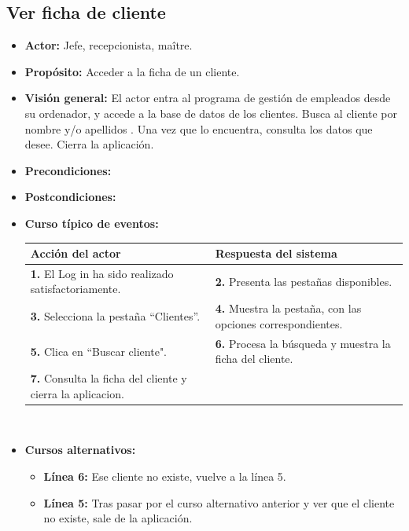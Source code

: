 \documentclass[spanish,a4paper,11pt, twoside]{report}	%
\begin{document}

	\subsection{Ver ficha de cliente}
			\begin{itemize}
			\item \textbf{Actor:} Jefe, recepcionista, maître.
			\item \textbf{Propósito:} Acceder a la ficha de un cliente.
			\item \textbf{Visión general:} El actor entra al programa de gestión de empleados desde su ordenador, y accede a la base de datos de los clientes. Busca al cliente por nombre y/o apellidos . Una vez que lo encuentra, consulta los datos que desee. Cierra la aplicación. 
			\item \textbf{Precondiciones:} 
			\item \textbf{Postcondiciones:} 
			\item \textbf{Curso típico de eventos:} 	\\
				\begin{tabular}{|p{6cm}||p{6cm}|}
				\hline
				\textbf{Acción del actor} & \textbf{Respuesta del sistema} \\ \hline \hline
				\textbf{1.} El Log in ha sido realizado satisfactoriamente. & \textbf{2.} Presenta las pestañas disponibles.\\ \hline
				\textbf{3.} Selecciona la pestaña “Clientes”. & \textbf{4.} Muestra la pestaña, con las opciones correspondientes. \\ \hline
				\textbf{5.} Clica en “Buscar cliente".	& \textbf{6.} Procesa la búsqueda y muestra la ficha del cliente. \\ \hline
				\textbf{7.} Consulta la ficha del cliente y cierra la aplicacion.& \\ \hline
				
			\end{tabular}
			\\
			\item \textbf{Cursos alternativos:} 
			\begin{itemize}
			\item  \textbf{Línea 6:} Ese cliente no existe, vuelve a la línea 5.
			\item  \textbf{Línea 5:} Tras pasar por el curso alternativo anterior y ver que el cliente no existe, sale de la aplicación.
			\end {itemize}
		\end{itemize}%
\end{document}
